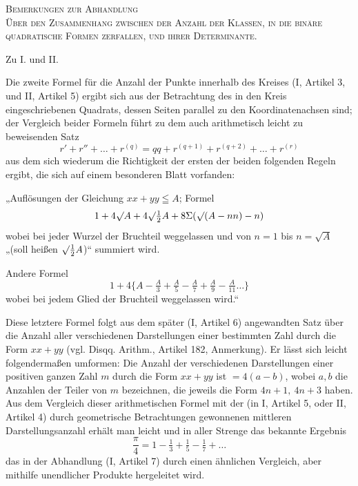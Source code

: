 \par\bigskip{}
\begin{center}
\textsc{Bemerkungen zur Abhandlung}\\[1em]
\textsc{Über den Zusammenhang zwischen der Anzahl der Klassen, in die binäre quadratische Formen zerfallen, und ihrer Determinante.}
\end{center}
\par\medskip{}\centerline{Zu I. und II.}\smallskip

Die zweite Formel für die Anzahl der Punkte innerhalb des Kreises (I, Artikel 3, und II, Artikel 5) ergibt sich aus der Betrachtung des in den Kreis eingeschriebenen Quadrats, dessen Seiten parallel zu den Koordinatenachsen sind; der Vergleich beider Formeln führt zu dem auch arithmetisch leicht zu beweisenden Satz
\[
r'+r''+\ldots+r^{(q)}=qq+r^{(q+1)}+r^{(q+2)}+\ldots+r^{(r)}
\]
aus dem sich wiederum die Richtigkeit der ersten der beiden folgenden Regeln ergibt, die sich auf einem besonderen Blatt vorfanden:

„Auflösungen der Gleichung $xx+yy\leqq A$; Formel
\[
1+4\surd A+4\surd\tfrac12 A+8\Sigma(\surd(A-nn)-n)
\]
wobei bei jeder Wurzel der Bruchteil weggelassen und von $n=1$ bis $n=\surd A$ „(soll heißen $\surd\tfrac12 A$)“ summiert wird.

Andere Formel
\[
1+4\{A-\tfrac A3+\tfrac A5-\tfrac A7+\tfrac A9-\tfrac A{11}\ldots\}
\]
wobei bei jedem Glied der Bruchteil weggelassen wird.“

Diese letztere Formel folgt aus dem später (I, Artikel 6) angewandten Satz über die Anzahl aller verschiedenen Darstellungen einer bestimmten Zahl durch die Form $xx+yy$ (vgl. Disqq. Arithm., Artikel 182, Anmerkung). Er lässt sich leicht folgendermaßen umformen: Die Anzahl der verschiedenen Darstellungen einer positiven ganzen Zahl $m$ durch die Form $xx+yy$ ist $=4(a-b)$, wobei $a,b$ die Anzahlen der Teiler von $m$ bezeichnen, die jeweils die Form $4n+1,\ 4n+3$ haben. Aus dem Vergleich
dieser arithmetischen Formel mit der (in I, Artikel 5, oder II, Artikel 4) durch geometrische Betrachtungen gewonnenen mittleren Darstellungsanzahl erhält man leicht und in aller Strenge das bekannte Ergebnis
\[
\frac\pi4=1-\tfrac13+\tfrac15-\tfrac17+\ldots
\]
das in der Abhandlung (I, Artikel 7) durch einen ähnlichen Vergleich, aber mithilfe unendlicher Produkte hergeleitet wird.
